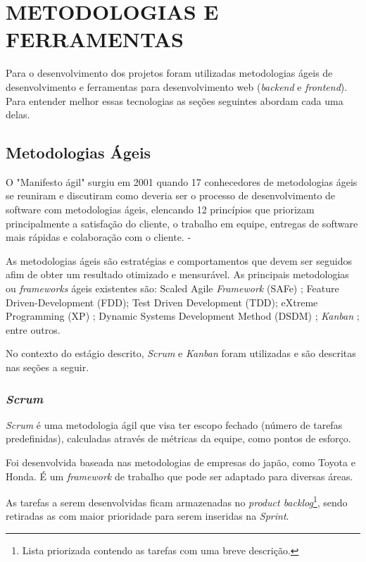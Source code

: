 \chapter{METODOLOGIAS E FERRAMENTAS}
\label{cap:elementos}

Para o desenvolvimento dos projetos foram utilizadas metodologias ágeis de desenvolvimento e ferramentas para desenvolvimento web (\textit{backend} e \textit{frontend}). Para entender melhor essas tecnologias as seções seguintes abordam cada uma delas.
\section{Metodologias Ágeis}

O "Manifesto ágil" surgiu em 2001 quando 17 conhecedores de metodologias ágeis se reuniram e discutiram como deveria ser o processo de desenvolvimento de software com metodologias ágeis, elencando 12 princípios que priorizam principalmente a satisfação do cliente, o trabalho em equipe, entregas de software mais rápidas e colaboração com o cliente. - \cite{manifestoAgil}

As metodologias ágeis são estratégias e comportamentos que devem ser seguidos afim de obter um resultado otimizado e mensurável. 
As principais metodologias ou \textit{frameworks} ágeis existentes são: 
Scaled Agile \textit{Framework} (SAFe) \cite{hayes2016scaling};
Feature Driven-Development (FDD)\cite{fdd};
Test Driven Development (TDD)\cite{beck2003test};
eXtreme Programming (XP) \cite{wildt2015extreme};
Dynamic Systems Development Method (DSDM) \cite{stapleton1997dsdm};
\textit{Kanban} \cite{boeg2010kanban};
entre outros.

No contexto do estágio descrito, \textit{Scrum} e \textit{Kanban} foram utilizadas e são descritas nas seções a seguir.
\subsection{\textit{Scrum}}

\textit{Scrum} é uma metodologia ágil que visa ter escopo fechado (número de tarefas predefinidas), calculadas através de métricas da equipe, como pontos de esforço.

Foi desenvolvida baseada nas metodologias de empresas do japão, como Toyota e Honda. É um \textit{framework} de trabalho que pode ser adaptado para diversas áreas.

As tarefas a serem desenvolvidas ficam armazenadas no \textit{product backlog}\footnote{Lista priorizada contendo as tarefas com uma breve descrição.}, sendo retiradas as com maior prioridade para serem inseridas na \textit{Sprint}.

